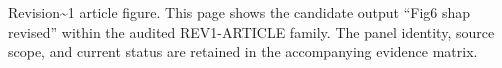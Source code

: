 Revision\textasciitilde{}1 article figure. This page shows the candidate output ``Fig6 shap revised'' within the audited REV1-ARTICLE family. The panel identity, source scope, and current status are retained in the accompanying evidence matrix.
